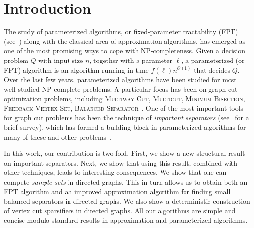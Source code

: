 \documentclass[11pt]{article}
\newcommand{\OO}{\mathcal{O}}
\begin{document}





\newpage
\section{Introduction}


The study of parameterized algorithms, or fixed-parameter tractability (FPT) (see~\cite{cygan2015parameterized,downey2013fundamentals}) along with the classical area of approximation algorithms, has emerged as one of the most promising ways to cope with NP-completeness. Given a decision problem $Q$ with input size $n$, together with a parameter $\ell$, a parameterized (or FPT) algorithm is an algorithm running in time $f(\ell) n^{\OO(1)}$ that decides $Q$. Over the last few years, parameterized algorithms have been studied for most well-studied NP-complete problems. A particular focus has been on graph cut optimization problems, including {\textsc{Multiway Cut}}, {\textsc{Multicut}}, {\textsc{Minimum Bisection}}, {\textsc{Feedback Vertex Set}}, {\textsc{Balanced Separator}}~\cite{marx2006parameterized,fm06,chen2008fixed,marx2011fixed,cygan2014minimum,cygan2020randomized,li2022detecting}.
One of the most important tools for graph cut problems has been the technique of \emph{important separators} (see~\cite{marx2011important} for a brief survey), which has formed a building block in parameterized algorithms for many of these and other problems~\cite{marx2006parameterized,chen2008fixed,chen2009improved, chitnis2013fixed, lokshtanov2013clustering,lokshtanov2021fpt}.

In this work, our contribution is two-fold. First, we show a new structural result on important separators. Next, we show that using this result, combined with other techniques, leads to interesting consequences. We show that one can compute \emph{sample sets} in directed graphs. This in turn allows us to obtain both an FPT algorithm and an improved approximation algorithm for finding small balanced separators in directed graphs. We also show a deterministic construction of vertex cut sparsifiers in directed graphs. All our algorithms are simple and concise modulo standard results in approximation and parameterized algorithms. 
\end{document}
